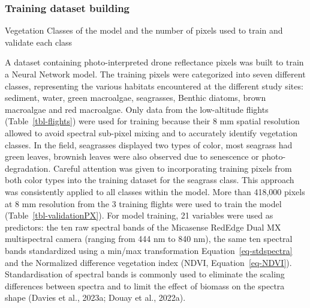 \documentclass[
  letterpaper,
  11pt,
  english,
  singlespacing,
  headsepline]{MastersDoctoralThesis}
\begin{document}
\begin{spacing}{1.5}
\begin{figure}
\end{figure}%

\subsubsection{Training dataset
building}\label{training-dataset-building}

\begin{table}

\caption{\label{tbl-validationPX}Vegetation Classes of the model and the
number of pixels used to train and validate each class}


\end{table}%

A dataset containing photo-interpreted drone reflectance pixels was
built to train a Neural Network model. The training pixels were
categorized into seven different classes, representing the various
habitats encountered at the different study sites: sediment, water,
green macroalgae, seagrasses, Benthic diatoms, brown macroalgae and red
macroalgae. Only data from the low-altitude flights
(Table~\ref{tbl-flights}) were used for training because their 8 mm
spatial resolution allowed to avoid spectral sub-pixel mixing and to
accurately identify vegetation classes. In the field, seagrasses
displayed two types of color, most seagrass had green leaves, brownish
leaves were also observed due to senescence or photo-degradation.
Careful attention was given to incorporating training pixels from both
color types into the training dataset for the seagrass class. This
approach was consistently applied to all classes within the model. More
than 418,000 pixels at 8 mm resolution from the 3 training flights were
used to train the model (Table~\ref{tbl-validationPX}). For model
training, 21 variables were used as predictors: the ten raw spectral
bands of the Micasense RedEdge Dual MX multispectral camera (ranging
from 444 nm to 840 nm), the same ten spectral bands standardized using a
min/max transformation Equation~\ref{eq-stdspectra} and the Normalized
difference vegetation index (NDVI, Equation~\ref{eq-NDVI}).
Standardisation of spectral bands is commonly used to eliminate the
scaling differences between spectra and to limit the effect of biomass
on the spectra shape (Davies et al., 2023a; Douay et al., 2022a).


\end{spacing}
\end{document}
